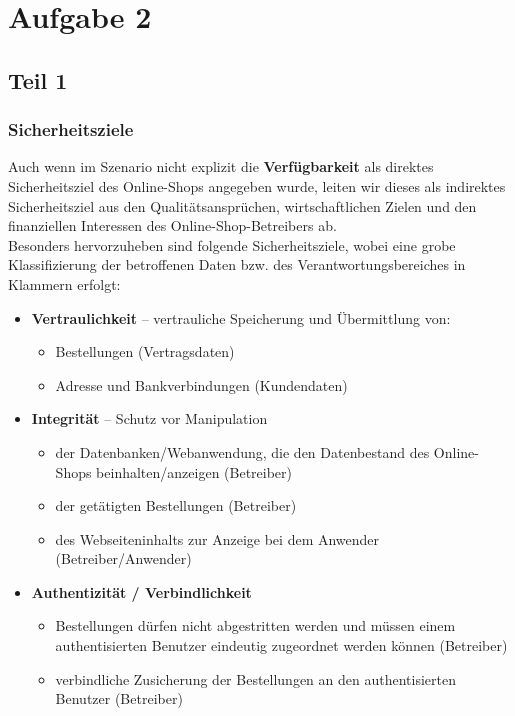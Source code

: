 \chapter{Aufgabe 2}

\section{Teil 1}

\subsection{Sicherheitsziele}

Auch wenn im Szenario nicht explizit die \textbf{Verfügbarkeit} als direktes Sicherheitsziel des Online-Shops angegeben wurde, leiten wir dieses als indirektes Sicherheitsziel aus den Qualitätsansprüchen, wirtschaftlichen Zielen und den finanziellen Interessen des Online-Shop-Betreibers ab.\\
Besonders hervorzuheben sind folgende Sicherheitsziele, wobei eine grobe Klassifizierung der betroffenen Daten bzw. des Verantwortungsbereiches in Klammern erfolgt:

\begin{itemize}
    \itemsep0.5em
    \item \textbf{Vertraulichkeit} – vertrauliche Speicherung und Übermittlung von:
    \begin{itemize}
        \item Bestellungen (Vertragsdaten)
        \item Adresse und Bankverbindungen (Kundendaten)
    \end{itemize}
    \item \textbf{Integrität} – Schutz vor Manipulation
    \begin{itemize}
        \item der Datenbanken/Webanwendung, die den Datenbestand des Online-Shops beinhalten/anzeigen (Betreiber)
        \item der getätigten Bestellungen (Betreiber)
        \item des Webseiteninhalts zur Anzeige bei dem Anwender (Betreiber/Anwender)
    \end{itemize}
    \item \textbf{Authentizität / Verbindlichkeit}
    \begin{itemize}
        \item Bestellungen dürfen nicht abgestritten werden und müssen einem authentisierten Benutzer eindeutig zugeordnet werden können (Betreiber)
        \item verbindliche Zusicherung der Bestellungen an den authentisierten Benutzer (Betreiber)
    \end{itemize}
\end{itemize}

